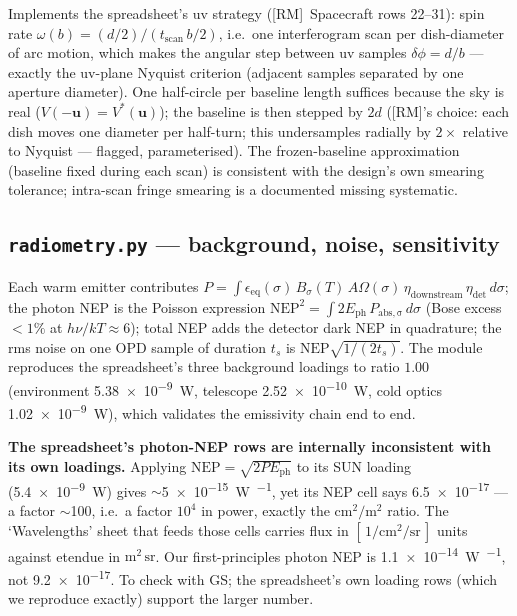\documentclass[11pt]{article}
\newcommand{\file}[1]{\textcolor{plumdark}{\texttt{\small #1}}}
\begin{document}
Implements the spreadsheet's uv strategy ([RM]~Spacecraft rows 22--31):
spin rate $\omega(b) = (d/2)/(t_\mathrm{scan}\,b/2)$, i.e.\ one interferogram
scan per dish-diameter of arc motion, which makes the angular step between uv
samples $\delta\phi = d/b$ --- exactly the uv-plane Nyquist criterion (adjacent
samples separated by one aperture diameter). One half-circle per baseline
length suffices because the sky is real ($V(-\mathbf u) = V^*(\mathbf u)$);
the baseline is then stepped by $2d$ ([RM]'s choice: each dish moves one
diameter per half-turn; this undersamples radially by $2\times$ relative to
Nyquist --- flagged, parameterised). The frozen-baseline approximation
(baseline fixed during each scan) is consistent with the design's own
smearing tolerance; intra-scan fringe smearing is a documented missing
systematic.

\subsection{\file{radiometry.py} --- background, noise, sensitivity}

\begin{physicsbox}
Each warm emitter contributes
$P = \int \epsilon_\mathrm{eq}(\sigma)\, B_\sigma(T)\, A\Omega(\sigma)\,
\eta_\mathrm{downstream}\, \eta_\mathrm{det}\, d\sigma$; the photon NEP is
the Poisson expression $\mathrm{NEP}^2 = \int 2 E_\mathrm{ph}\,
P_\mathrm{abs,\sigma}\, d\sigma$ (Bose excess $<1\%$ at
$h\nu/kT \approx 6$); total NEP adds the detector dark NEP in quadrature;
the rms noise on one OPD sample of duration $t_s$ is
$\mathrm{NEP}\sqrt{1/(2t_s)}$. The module reproduces the spreadsheet's
three background loadings to ratio $1.00$ (environment
\SI{5.38e-9}{\watt}, telescope \SI{2.52e-10}{\watt}, cold optics
\SI{1.02e-9}{\watt}), which validates the emissivity chain end to end.
\end{physicsbox}

\begin{flagbox}
\textbf{The spreadsheet's photon-NEP rows are internally inconsistent with
its own loadings.} Applying $\mathrm{NEP}=\sqrt{2PE_\mathrm{ph}}$ to its SUN
loading (\SI{5.4e-9}{\watt}) gives $\sim$\SI{5e-15}{\watt\per\sqrt{\hertz}},
yet its NEP cell says \SI{6.5e-17}{} --- a factor $\sim$100, i.e.\ a factor
$10^4$ in power, exactly the $\mathrm{cm}^2/\mathrm{m}^2$ ratio. The
`Wavelengths' sheet that feeds those cells carries flux in
$[\,1/\mathrm{cm}^2/\mathrm{sr}\,]$ units against etendue in
$\mathrm{m}^2\,\mathrm{sr}$. Our first-principles photon NEP is
\SI{1.1e-14}{\watt\per\sqrt{\hertz}}, not \SI{9.2e-17}{}. To check with GS;
the spreadsheet's own loading rows (which we reproduce exactly) support the
larger number.
\end{flagbox}
\end{document}
